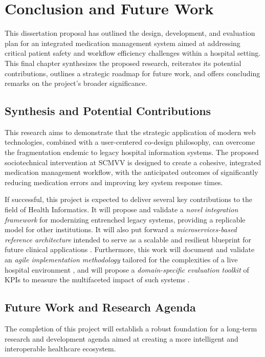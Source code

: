 \chapter{Conclusion and Future Work}
\label{chap:Conclusion}

This dissertation proposal has outlined the design, development, and evaluation plan for an integrated medication management system aimed at addressing critical patient safety and workflow efficiency challenges within a hospital setting. This final chapter synthesizes the proposed research, reiterates its potential contributions, outlines a strategic roadmap for future work, and offers concluding remarks on the project's broader significance.

\section{Synthesis and Potential Contributions}

This research aims to demonstrate that the strategic application of modern web technologies, combined with a user-centered co-design philosophy, can overcome the fragmentation endemic to legacy hospital information systems. The proposed sociotechnical intervention at SCMVV is designed to create a cohesive, integrated medication management workflow, with the anticipated outcomes of significantly reducing medication errors and improving key system response times.

If successful, this project is expected to deliver several key contributions to the field of Health Informatics. It will propose and validate a \textit{novel integration framework} for modernizing entrenched legacy systems, providing a replicable model for other institutions. It will also put forward a \textit{microservices-based reference architecture} intended to serve as a scalable and resilient blueprint for future clinical applications \cite{newman2021}. Furthermore, this work will document and validate an \textit{agile implementation methodology} tailored for the complexities of a live hospital environment \cite{may2013}, and will propose a \textit{domain-specific evaluation toolkit} of KPIs to measure the multifaceted impact of such systems \cite{donabedian1988}.

\section{Future Work and Research Agenda}

The completion of this project will establish a robust foundation for a long-term research and development agenda aimed at creating a more intelligent and interoperable healthcare ecosystem.

